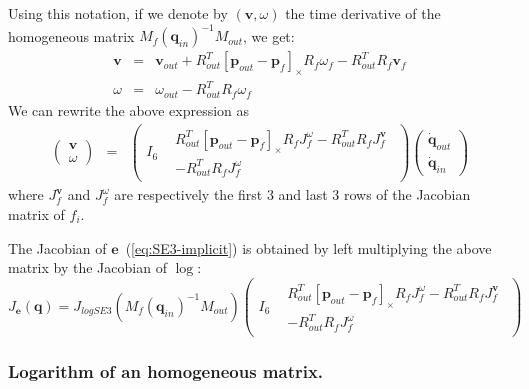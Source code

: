 \documentclass {article}
\newcommand\conf{\mathbf{q}}
\begin{document}
Using this notation, if we denote by $(\mathbf{v}, \omega)$ the time derivative of the homogeneous matrix $M_{f}(\conf_{in})^{-1} M_{out}$, we get:
\begin{eqnarray}
\mathbf{v} &=& \mathbf{v}_{out} + R_{out}^T [\mathbf{p}_{out} - \mathbf{p}_{f}]_{\times} R_{f}\omega_{f} - R_{out}^T R_{f}\mathbf{v}_{f}\\
\omega &=& \omega_{out} - R_{out}^TR_{f} \omega_{f}
\end{eqnarray}
We can rewrite the above expression as
\begin{eqnarray*}
\left(\begin{array}{c}\mathbf{v}\\\omega\end{array}\right) &=&
\left(\begin{array}{cc}I_6 & \begin{array}{c}R_{out}^T [\mathbf{p}_{out} - \mathbf{p}_{f}]_{\times} R_{f}J_{f}^{\omega} - R_{out}^T R_{f}J_{f}^{\mathbf{v}}\\
-R_{out}^TR_{f} J_{f}^{\omega}\end{array}\end{array}\right)
\left(\begin{array}{c}\dot{\conf}_{out} \\\dot{\conf}_{in}\end{array}\right)
\end{eqnarray*}
where $J_{f}^{\mathbf{v}}$ and $J_{f}^{\omega}$ are respectively the first 3 and last
3 rows of the Jacobian matrix of $f_i$.

The Jacobian of $\mathbf{e}$~(\ref{eq:SE3-implicit}) is obtained by left multiplying the above matrix by the Jacobian of $\log$:
$$
J_{\mathbf{e}} (\conf) = J_{logSE3} (M_{f}(\conf_{in})^{-1} M_{out})
\left(\begin{array}{cc}I_6 & \begin{array}{c}R_{out}^T [\mathbf{p}_{out} - \mathbf{p}_{f}]_{\times} R_{f}J_{f}^{\omega} - R_{out}^T R_{f}J_{f}^{\mathbf{v}}\\
-R_{out}^TR_{f} J_{f}^{\omega}\end{array}\end{array}\right)
$$

\subsubsection {Logarithm of an homogeneous matrix.}
\end{document}
